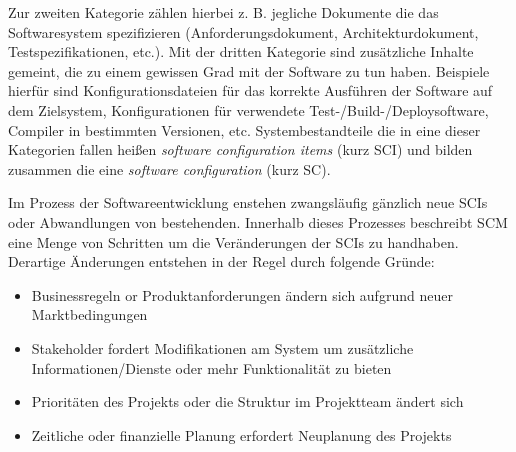 \documentclass[runningheads,a4paper]{uwsese}
\begin{document}
Zur zweiten Kategorie zählen hierbei z. B. jegliche Dokumente die das Softwaresystem
spezifizieren (Anforderungsdokument, Architekturdokument, Testspezifikationen, etc.).
Mit der dritten Kategorie sind zusätzliche Inhalte gemeint, die zu einem gewissen
Grad mit der Software zu tun haben. Beispiele hierfür sind Konfigurationsdateien
für das korrekte Ausführen der Software auf dem Zielsystem, Konfigurationen für
verwendete Test-/Build-/Deploysoftware, Compiler in bestimmten Versionen, etc.
Systembestandteile die in eine dieser Kategorien fallen heißen
{\em software configuration items} (kurz SCI) und bilden zusammen die eine
{\em software configuration} (kurz SC).

Im Prozess der Softwareentwicklung enstehen zwangsläufig gänzlich neue SCIs oder
Abwandlungen von bestehenden.
Innerhalb dieses Prozesses beschreibt SCM eine Menge von Schritten um die
Veränderungen der SCIs zu handhaben. Derartige Änderungen entstehen in
der Regel durch folgende Gründe:

\begin{itemize}
	\item Businessregeln or Produktanforderungen ändern sich aufgrund neuer Marktbedingungen
	\item Stakeholder fordert Modifikationen am System um zusätzliche Informationen/Dienste
        oder mehr Funktionalität zu bieten
	\item Prioritäten des Projekts oder die Struktur im Projektteam ändert sich
	\item Zeitliche oder finanzielle Planung erfordert Neuplanung des Projekts
\end{itemize}





%
%
\end{document}
